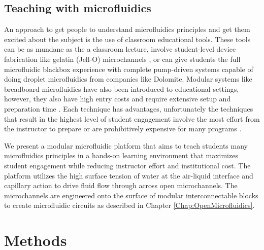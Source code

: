 \subsection{Teaching with microfluidics}
An approach to get people to understand microfluidics principles and get them excited about the subject is the use of classroom educational tools. These tools can be as mundane as the a classroom lecture, involve student-level device fabrication like gelatin (Jell-O) microchannels \cite{Yang2013}, or can give students the full microfluidic blackbox experience with complete pump-driven systems capable of doing droplet microfluidics from companies like Dolomite. Modular systems like breadboard microfluidics have also been introduced to educational settings, however, they also have high entry costs and require extensive setup and preparation time \cite{Chen2011, Shaikh2005, Chen2014}. Each technique has advantages, unfortunately the techniques that result in the highest level of student engagement involve the most effort from the instructor to prepare or are prohibitively expensive for many programs \cite{Fintschenko2011Education:Laboratory}. 

We present a modular microfluidic platform that aims to teach students many microfluidics principles in a hands-on learning environment that maximizes student engagement while reducing instructor effort and institutional cost. The platform utilizes the high surface tension of water at the air-liquid interface and capillary action to drive fluid flow through across open microchannels. The microchannels are engineered onto the surface of modular interconnectable blocks to create microfluidic circuits as described in Chapter \ref{Chap:OpenMicrofluidics}.

\section{Methods}

